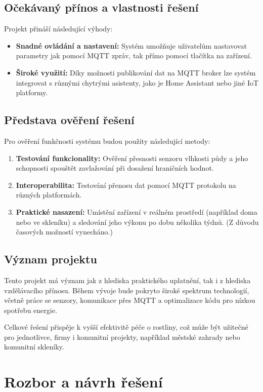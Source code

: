 \documentclass[a4paper, 11pt]{article}
\begin{document}
\subsection{Očekávaný přínos a vlastnosti řešení}
Projekt přináší následující výhody:
\begin{itemize}
    \item \textbf{Snadné ovládání a nastavení:} Systém umožňuje uživatelům nastavovat parametry jak pomocí MQTT zpráv, tak přímo pomocí tlačítka na zařízení.
    \item \textbf{Široké využití:} Díky možnosti publikování dat na MQTT broker lze systém integrovat s různými chytrými asistenty, jako je Home Assistant nebo jiné IoT platformy.
\end{itemize}

\subsection{Představa ověření řešení}
Pro ověření funkčnosti systému budou použity následující metody:
\begin{enumerate}
    \item \textbf{Testování funkcionality:} Ověření přesnosti senzoru vlhkosti půdy a jeho schopnosti spouštět zavlažování při dosažení hraničních hodnot.
    \item \textbf{Interoperabilita:} Testování přenosu dat pomocí MQTT protokolu na různých platformách.
    \item \textbf{Praktické nasazení:} Umístění zařízení v reálném prostředí (například doma nebo ve skleníku) a sledování jeho výkonu po dobu několika týdnů. (Z důvodu časových možností vynecháno.)
\end{enumerate}

\subsection{Význam projektu}
Tento projekt má význam jak z hlediska praktického uplatnění, tak i z hlediska vzdělávacího přínosu. Během vývoje bude pokryto široké spektrum technologií, 
včetně práce se senzory, komunikace přes MQTT a optimalizace kódu pro nízkou spotřebu energie.

Celkové řešení přispěje k vyšší efektivitě péče o rostliny, což může být užitečné pro jednotlivce, firmy i komunitní projekty, například městské zahrady nebo komunitní skleníky.

\section{Rozbor a návrh řešení}
\end{document}

